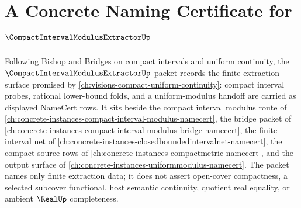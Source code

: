 \chapter{A Concrete Naming Certificate for $\CompactIntervalModulusExtractorUp$}
\label{ch:concrete-instances-compact-interval-modulus-extractor-namecert}

Following Bishop and Bridges on compact intervals and uniform continuity, the $\CompactIntervalModulusExtractorUp$ packet records the finite extraction surface promised by \autoref{ch:visions-compact-uniform-continuity}: compact interval probes, rational lower-bound folds, and a uniform-modulus handoff are carried as displayed NameCert rows. It sits beside the compact interval modulus route of \autoref{ch:concrete-instances-compact-interval-modulus-namecert}, the bridge packet of \autoref{ch:concrete-instances-compact-interval-modulus-bridge-namecert}, the finite interval net of \autoref{ch:concrete-instances-closedboundedintervalnet-namecert}, the compact source rows of \autoref{ch:concrete-instances-compactmetric-namecert}, and the output surface of \autoref{ch:concrete-instances-uniformmodulus-namecert}. The packet names only finite extraction data; it does not assert open-cover compactness, a selected subcover functional, host semantic continuity, quotient real equality, or ambient $\RealUp$ completeness.

